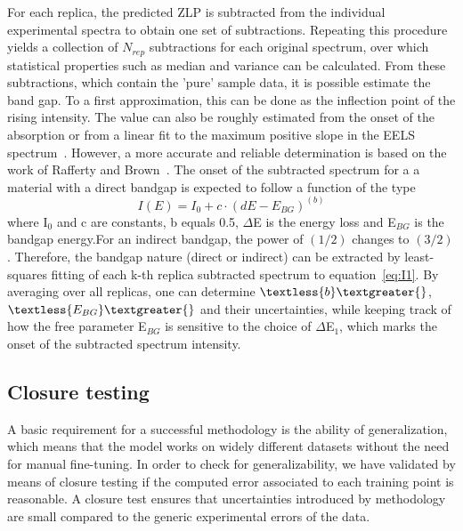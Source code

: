 %
For each replica, the predicted ZLP is subtracted from the individual 
experimental spectra to obtain one set of subtractions. 
Repeating this procedure yields a collection of $N_{rep}$ subtractions 
for each original spectrum, over which statistical properties such as 
median and variance can be calculated.\newline
%
From these subtractions, which contain the 'pure' sample data, 
it is possible estimate the band gap. To a first approximation,
this can be done as the inflection point of the rising intensity.
%
The value can also be roughly estimated from the onset of the absorption 
or from a linear fit to the maximum positive slope in the 
EELS spectrum~\cite{Schamm:2003}. 
%
However, a more accurate and reliable determination is based on the work of 
Rafferty and Brown~\cite{Rafferty:2000}. The onset of the subtracted spectrum 
for a a material with a direct bandgap is expected to follow a function of the type
\begin{equation}\label{eq:I1}
    I(E) = I_0 + c\cdot(dE-E_{BG})^{(b)}
\end{equation}
where I$_0$ and c are constants, b equals 0.5, $\Delta$E is the energy loss and E$_{BG}$ 
is the bandgap energy.For an indirect bandgap, the power of $(1/2)$ changes to $(3/2)$. 
%
Therefore, the bandgap nature (direct or indirect) can be extracted by 
least-squares fitting of each k-th replica subtracted spectrum to equation~\ref{eq:I1}.
%
By averaging over all replicas, one can determine $\textless{b}\textgreater{}$, 
$\textless{E_{BG}}\textgreater{}$ 
and their uncertainties, while keeping track of how the free parameter
E$_{BG}$ is sensitive to the choice of $\Delta$E$_1$, which marks the onset
of the subtracted spectrum intensity.
%


\subsection{Closure testing}

%
A basic requirement for a successful methodology is the ability of generalization, 
which means that the model works on widely different datasets without 
the need for manual fine-tuning.
%
In order to check for generalizability, we have validated by means of 
closure testing\cite{Ball:2015oha} if the computed error 
associated to each training point is reasonable. 
%
A closure test ensures that uncertainties introduced by methodology are small 
compared to the generic experimental errors of the data. 
%
